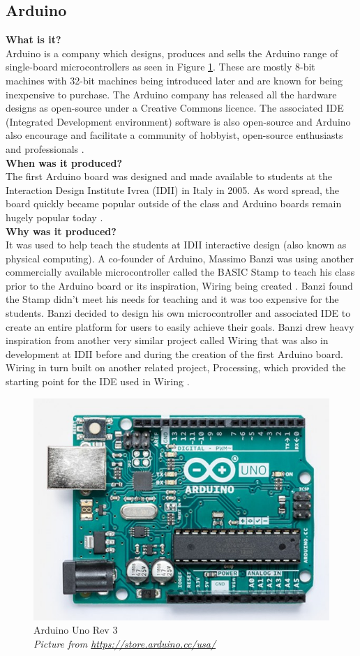 \subsection{Arduino}
\textbf{What is it?}\\
Arduino is a company which designs, produces and sells the Arduino range of single-board microcontrollers as seen in Figure \ref{ArduinoUno3}. These are mostly 8-bit machines with 32-bit machines being introduced later and are known for being inexpensive to purchase. The Arduino company has released all the hardware designs as open-source under a Creative Commons licence. The associated IDE (Integrated Development environment) software is also open-source and Arduino also encourage and facilitate a community of hobbyist, open-source enthusiasts and professionals 
\cite{RN133}. \\

\textbf{When was it produced?}\\
The first Arduino board was designed and made available to students at the Interaction Design Institute Ivrea (IDII) in Italy in 2005. As word spread, the board quickly became popular outside of the class and Arduino boards remain hugely popular today 
\cite{RN103}.\\

\textbf{Why was it produced?}\\
It was used to help teach the students at IDII interactive design (also known as physical computing). A co-founder of Arduino, Massimo Banzi was using another commercially available microcontroller called the BASIC Stamp to teach his class prior to the Arduino board or its inspiration, Wiring being created 
\cite{RN103}. Banzi found the Stamp didn't meet his needs for teaching and it was too expensive for the students. Banzi decided to design his own microcontroller and associated IDE to create an entire platform for users to easily achieve their goals. Banzi drew heavy inspiration from another very similar project called Wiring that was also in development at IDII before and during the creation of the first Arduino board. Wiring in turn built on another related project, Processing, which provided the starting point for the IDE used in Wiring 
\cite{RN110}\cite{RN135} \cite{RN111}. \\

\begin{figure} \begin{center}
\includegraphics[width=.3\linewidth]{pics/Arduino_uno_3} 
\end{center} 
\caption{Arduino Uno Rev 3\\ \textit{\small{Picture from \url{https://store.arduino.cc/usa/}}}}
\label{ArduinoUno3}
\end{figure} 

